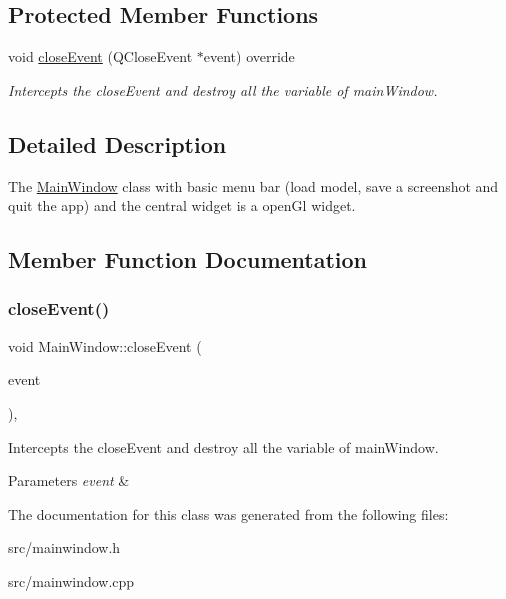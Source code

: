 \subsection*{Protected Member Functions}
\begin{DoxyCompactItemize}
\item 
void \mbox{\hyperlink{class_main_window_a05fb9d72c044aa3bb7d187b994704e2f}{close\+Event}} (Q\+Close\+Event $\ast$event) override
\begin{DoxyCompactList}\small\item\em Intercepts the close\+Event and destroy all the variable of main\+Window. \end{DoxyCompactList}\end{DoxyCompactItemize}


\subsection{Detailed Description}
The \mbox{\hyperlink{class_main_window}{Main\+Window}} class with basic menu bar (load model, save a screenshot and quit the app) and the central widget is a open\+Gl widget. 

\subsection{Member Function Documentation}
\mbox{\label{class_main_window_a05fb9d72c044aa3bb7d187b994704e2f}} 
\subsubsection{\texorpdfstring{close\+Event()}{closeEvent()}}
{\footnotesize\ttfamily void Main\+Window\+::close\+Event (\begin{DoxyParamCaption}\item[{Q\+Close\+Event $\ast$}]{event }\end{DoxyParamCaption})\hspace{0.3cm}{\ttfamily [override]}, {\ttfamily [protected]}}



Intercepts the close\+Event and destroy all the variable of main\+Window. 


\begin{DoxyParams}{Parameters}
{\em event} & \\
\hline
\end{DoxyParams}


The documentation for this class was generated from the following files\+:\begin{DoxyCompactItemize}
\item 
src/mainwindow.\+h\item 
src/mainwindow.\+cpp\end{DoxyCompactItemize}
